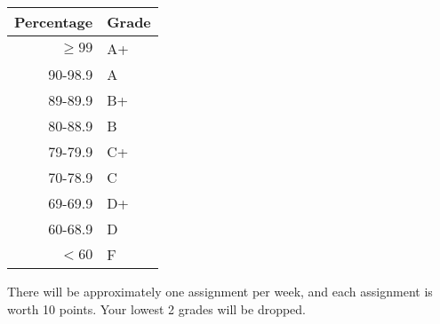 \documentclass{tufte-handout}
\begin{document}
\begin{margintable}
\begin{tabular}{rl}
Percentage & Grade \\
\hline 
$\ge99$ & A+ \\
90-98.9 & A \\
89-89.9 & B+ \\
80-88.9 & B \\
79-79.9 & C+ \\
70-78.9 & C \\
69-69.9 & D+ \\
60-68.9 & D \\
$<60$ & F \\
\hline
\end{tabular}
\end{margintable}



There will be approximately one assignment per week, and each assignment is worth 10 points. Your lowest 2 grades will be dropped. 
\end{document}
